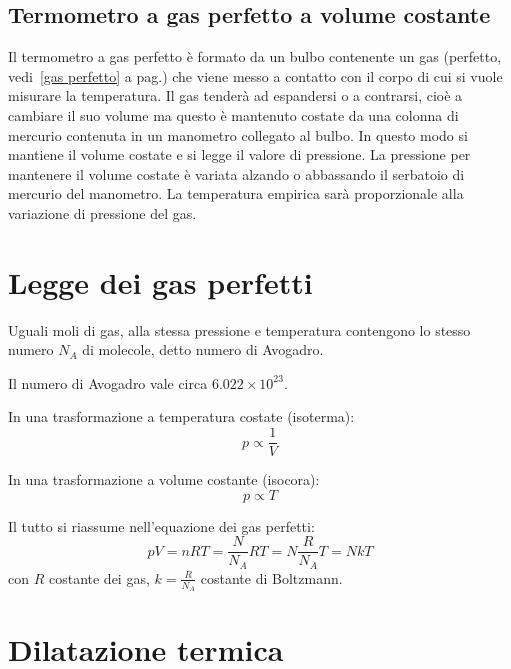 \subsection{Termometro a gas perfetto a volume costante}
Il termometro a gas perfetto è formato da un bulbo contenente un gas (perfetto, vedi~\ref{gas perfetto} a pag.\@ \pageref{gas perfetto}) che viene messo a contatto con il corpo di cui si vuole misurare la temperatura. Il gas tenderà ad espandersi o a contrarsi, cioè a cambiare il suo volume ma questo è mantenuto costate da una colonna di mercurio contenuta in un manometro collegato al bulbo. In questo modo si mantiene il volume costate e si legge il valore di pressione. La pressione per mantenere il volume costate è variata alzando o abbassando il serbatoio di mercurio del manometro. La temperatura empirica sarà proporzionale alla variazione di pressione del gas.

\section{Legge dei gas perfetti}
\begin{legge}[Avogadro(1811)]
   Uguali moli di gas, alla stessa pressione e temperatura contengono lo stesso numero $N_A$ di molecole, detto numero di Avogadro.
\end{legge}
Il numero di Avogadro vale circa $6.022\times 10^{23}$.
\begin{legge}
   In una trasformazione a temperatura costate (isoterma):
   \begin{equation}
      p\propto\frac{1}{V}
   \end{equation}
\end{legge}
\begin{legge}
   In una trasformazione a volume costante (isocora):
   \begin{equation}
      p\propto{T}
   \end{equation}
\end{legge}
Il tutto si riassume nell'equazione dei gas perfetti:
\begin{equation}
   pV=nRT=\frac{N}{N_A}RT=N\frac{R}{N_A}T=NkT
\end{equation}
con $R$ costante dei gas, $k=\frac{R}{N_A}$ costante di Boltzmann.
\section{Dilatazione termica}
